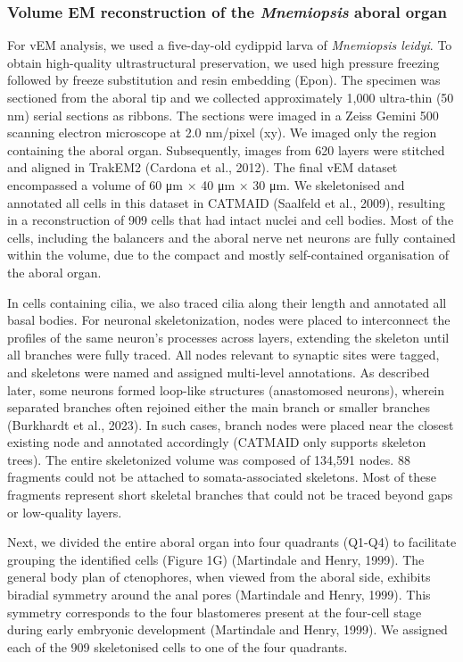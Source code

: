 \documentclass[
  11pt,
]{article}
\begin{document}
\subsubsection{\texorpdfstring{Volume EM reconstruction of the
\emph{Mnemiopsis} aboral
organ}{Volume EM reconstruction of the Mnemiopsis aboral organ}}\label{volume-em-reconstruction-of-the-mnemiopsis-aboral-organ}

For vEM analysis, we used a five-day-old cydippid larva of
\emph{Mnemiopsis leidyi}. To obtain high-quality ultrastructural
preservation, we used high pressure freezing followed by freeze
substitution and resin embedding (Epon). The specimen was sectioned from
the aboral tip and we collected approximately 1,000 ultra-thin (50 nm)
serial sections as ribbons. The sections were imaged in a Zeiss Gemini
500 scanning electron microscope at 2.0 nm/pixel (xy). We imaged only
the region containing the aboral organ. Subsequently, images from 620
layers were stitched and aligned in TrakEM2 (Cardona et al., 2012). The
final vEM dataset encompassed a volume of 60 μm × 40 μm × 30 μm. We
skeletonised and annotated all cells in this dataset in CATMAID
(Saalfeld et al., 2009), resulting in a reconstruction of 909 cells that
had intact nuclei and cell bodies. Most of the cells, including the
balancers and the aboral nerve net neurons are fully contained within
the volume, due to the compact and mostly self-contained organisation of
the aboral organ.

In cells containing cilia, we also traced cilia along their length and
annotated all basal bodies. For neuronal skeletonization, nodes were
placed to interconnect the profiles of the same neuron's processes
across layers, extending the skeleton until all branches were fully
traced. All nodes relevant to synaptic sites were tagged, and skeletons
were named and assigned multi-level annotations. As described later,
some neurons formed loop-like structures (anastomosed neurons), wherein
separated branches often rejoined either the main branch or smaller
branches (Burkhardt et al., 2023). In such cases, branch nodes were
placed near the closest existing node and annotated accordingly (CATMAID
only supports skeleton trees). The entire skeletonized volume was
composed of 134,591 nodes. 88 fragments could not be attached to
somata-associated skeletons. Most of these fragments represent short
skeletal branches that could not be traced beyond gaps or low-quality
layers.

Next, we divided the entire aboral organ into four quadrants (Q1-Q4) to
facilitate grouping the identified cells (Figure 1G) (Martindale and
Henry, 1999). The general body plan of ctenophores, when viewed from the
aboral side, exhibits biradial symmetry around the anal pores
(Martindale and Henry, 1999). This symmetry corresponds to the four
blastomeres present at the four-cell stage during early embryonic
development (Martindale and Henry, 1999). We assigned each of the 909
skeletonised cells to one of the four quadrants.
\end{document}
